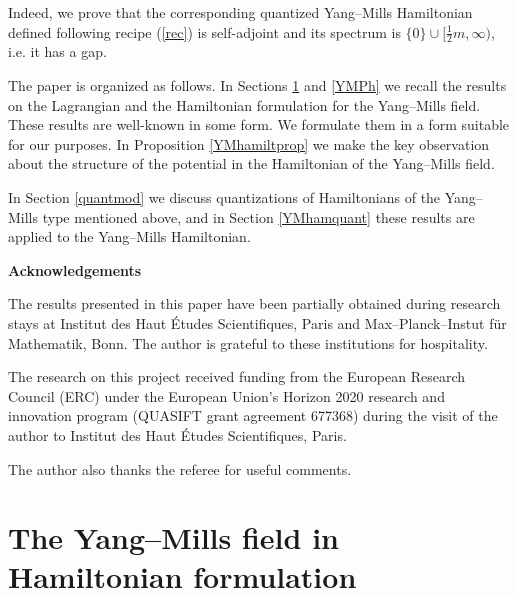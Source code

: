 \documentclass{amsart}
\begin{document}
Indeed, we prove that the corresponding quantized Yang--Mills Hamiltonian defined following recipe (\ref{rec}) is self-adjoint and its spectrum is $\{0\}\cup [\frac12m,\infty)$, i.e. it has a gap.

The paper is organized as follows. In Sections \ref{YMH} and \ref{YMPh} we recall the results on the Lagrangian and the Hamiltonian formulation for the Yang--Mills field. These results are well-known in some form. We formulate them in a form suitable for our purposes. In Proposition \ref{YMhamiltprop} we make the key observation about the structure of the potential in the Hamiltonian of the Yang--Mills field.

In Section \ref{quantmod} we discuss quantizations of Hamiltonians of the Yang--Mills type mentioned above, and in Section \ref{YMhamquant} these results are applied to the Yang--Mills Hamiltonian. 

{\bf Acknowledgements}

The results presented in this paper have been partially obtained during research stays at Institut des Haut \'{E}tudes Scientifiques, Paris and Max--Planck--Instut f\"{u}r Mathematik, Bonn. The author is grateful to these institutions for hospitality. 

The research on this project received funding from the European Research Council (ERC) under the European Union's Horizon 2020 research and innovation program (QUASIFT grant agreement 677368) during the visit of the author to Institut des Haut \'{E}tudes Scientifiques, Paris.

The author also thanks the referee for useful comments.








\section{The Yang--Mills field in Hamiltonian formulation}\label{YMH}
\end{document}
